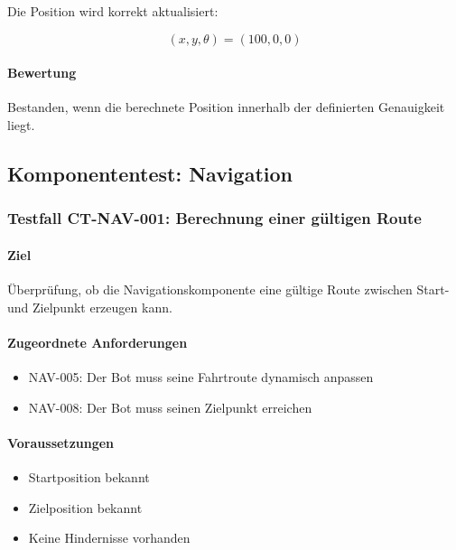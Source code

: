 \documentclass[
  a4paper,
  12pt,
  DIV=12,        %
  parskip=half,  %
  headings=small %
]{scrartcl}
\theoremstyle{definition}
\providecommand{\tightlist}{%
  \setlength{\itemsep}{0pt}\setlength{\parskip}{0pt}}
\theoremstyle{definition}
\begin{document}
Die Position wird korrekt aktualisiert:

\[
(x,y,\theta)=(100,0,0)
\]

\paragraph{Bewertung}\label{bewertung-1}

Bestanden, wenn die berechnete Position innerhalb der definierten
Genauigkeit liegt.

\subsection{Komponententest:
Navigation}\label{komponententest-navigation}

\subsubsection{Testfall CT-NAV-001: Berechnung einer gültigen
Route}\label{testfall-ct-nav-001-berechnung-einer-guxfcltigen-route}

\paragraph{Ziel}\label{ziel-2}

Überprüfung, ob die Navigationskomponente eine gültige Route zwischen
Start- und Zielpunkt erzeugen kann.

\paragraph{Zugeordnete Anforderungen}\label{zugeordnete-anforderungen-2}

\begin{itemize}
\tightlist
\item
  NAV-005: Der Bot muss seine Fahrtroute dynamisch anpassen
\item
  NAV-008: Der Bot muss seinen Zielpunkt erreichen
\end{itemize}

\paragraph{Voraussetzungen}\label{voraussetzungen-2}

\begin{itemize}
\tightlist
\item
  Startposition bekannt
\item
  Zielposition bekannt
\item
  Keine Hindernisse vorhanden
\end{itemize}
\end{document}
